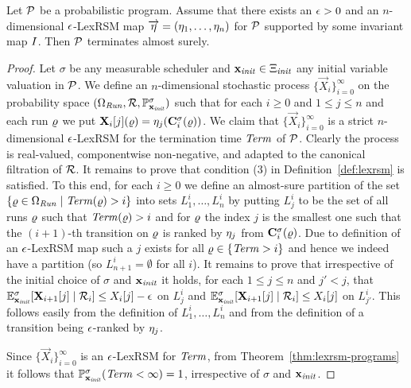 \begin{theorem}
\label{thm:lexrsm-programs}
Let $\mathcal{P}$ be a probabilistic program. Assume that there exists an $\epsilon>0$ 
and an $n$-dimensional $\epsilon$-LexRSM map 
$\overrightarrow{\eta}=(\eta_1,\dots,\eta_n)$ for 
$\mathcal{P}$ supported 
by some 
invariant map $I$. 
Then $\mathcal{P}$ terminates almost surely.
\end{theorem}
\begin{proof}
Let $\sigma$ be any measurable scheduler and $\mathbf{x}_{\mathit{init}}\in\Xi_{\mathit{init}}$ any 
initial variable valuation in $\mathcal{P}$.
We define an $n$-dimensional stochastic process 
$\{\vec{X}_{i}\}_{i=0}^{\infty} $ on the probability space 
$(\Omega_{\mathit{Run}},\mathcal{R},\mathbb{P}^{\sigma}_{\mathbf{x}_{\mathit{init}}})$ such 
that for each 
$i\geq 0$ and $1\leq j 
\leq n$ and each run $\varrho$ we put $\mathbf{X}_{i}[j](\varrho) = 
\eta_j(\mathbf{C}^{\sigma}_{i}(\varrho))$. We claim that $\{\vec{X}_{i}\}_{i=0}^{\infty}$ 
is a strict $n$-dimensional $\epsilon$-LexRSM for the termination time $\mathit{Term}$ of $\mathcal{P}$. Clearly 
the process is real-valued, componentwise non-negative, and adapted to the 
canonical filtration of $\mathcal{R}$. It remains to prove that condition (3) in 
Definition~\ref{def:lexrsm} is satisfied. To this end, for each $i\geq 0$ we 
define an almost-sure partition of the set $\{\varrho\in \Omega_{\mathit{Run}}\mid 
\mathit{Term}(\varrho) >i\}$ into sets $L^{i}_1,\dots,L^{i}_n$ by putting $L^i_j$ to be 
the set of all runs $\varrho$ such that $\mathit{Term}(\varrho)>i$ and for $\varrho$ the index 
$j$ is the smallest one such that the $(i+1)$-th transition on $\varrho$ is ranked 
by $\eta_j$ from $\mathbf{C}^{\sigma}_{i}(\varrho)$. Due to 
definition of an $\epsilon$-LexRSM map such a $j$ exists for all 
$\varrho\in\{\mathit{Term}>i\}$ and hence we indeed have a partition (so $L^i_{n+1}=\emptyset$ for all $i$). It remains to prove 
that irrespective of the initial choice of $\sigma$ and $\mathbf{x}_{\mathit{init}}$ it holds, 
for each $1\leq j 
\leq n$ and $j'<j$, that $\mathbb{E}^\sigma_{\mathbf{x}_{\mathit{init}}}[\mathbf{X}_{i+1}[j]\mid 
\mathcal{R}_i]\leq X_i[j]-\epsilon $ on $L_j^i$ and 
$\mathbb{E}^\sigma_{\mathbf{x}_{\mathit{init}}}[\mathbf{X}_{i+1}[j]\mid 
\mathcal{R}_i]\leq X_i[j] $ on $L_{j'}^i$. This follows easily from 
the definition of $L^{i}_1,\dots,L^{i}_n$ and from the definition of a 
transition being $\epsilon$-ranked by $\eta_j$.

Since  $\{\vec{X}_{i}\}_{i=0}^{\infty}$ 
is an $\epsilon$-LexRSM for $\mathit{Term}$, from Theorem~\ref{thm:lexrsm-programs} it 
follows that $\mathbb{P}^{\sigma}_{\mathbf{x}_{\mathit{init}}}(\mathit{Term} <\infty) =1$, irrespective of 
$\sigma$ and $\mathbf{x}_{\mathit{init}}$.
\end{proof} 

